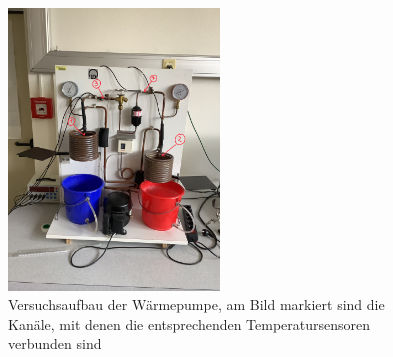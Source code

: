 \documentclass[12pt,english,ngerman]{scrartcl}
\begin{document}
\begin{figure}[H]
	\begin{center}
		\includegraphics[width =0.5\textwidth]{./figures/warmepumpe_anschlusse.png}
	\end{center}
	\caption[Versuchsaufbau der Wärmepumpe]{Versuchsaufbau der Wärmepumpe, am Bild markiert
		sind die Kanäle, mit denen die entsprechenden Temperatursensoren verbunden sind
	}\label{fig:warmepumpe}
\end{figure}
\end{document}
